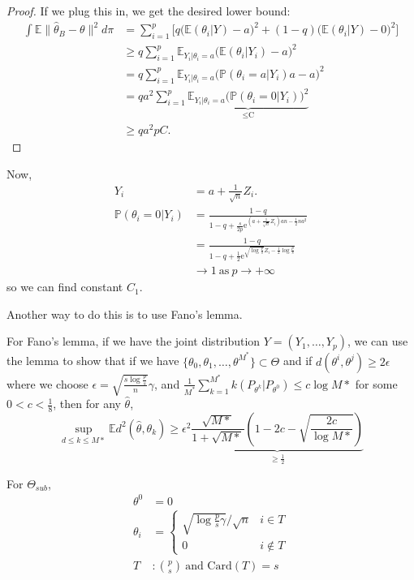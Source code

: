 \documentclass[twoside]{article}
\theoremstyle{definition}
\theoremstyle{definition}
\theoremstyle{remark}
\begin{document}
\begin{proof}
If we plug this in, we get the desired lower bound:
\[
\begin{aligned}
\int \mathbb{E} \| \hat\theta_B - \theta \|^2 d\pi &= \sum \limits_{i=1}^p \bigg[ q \bigg( \mathbb{E} (\theta_i | Y) - a \bigg)^2 + (1-q) \bigg( \mathbb{E} (\theta_i | Y) - 0 \bigg)^2 \bigg] \\
&\geq q \sum \limits_{i=1}^p \mathbb{E}_{Y_i | \theta_i = a} \bigg( \mathbb{E} (\theta_i | Y_i) - a \bigg) ^2 \\
&= q \sum \limits_{i=1}^p \mathbb{E}_{Y_i | \theta_i = a} \bigg( \mathbb{P} (\theta_i = a | Y_i)a - a \bigg)^2 \\
&= q a^2 \sum \limits_{i=1}^p \underbrace{\mathbb{E}_{Y_i | \theta_i = a} \bigg( \mathbb{P}(\theta_i = 0 | Y_i) \bigg)^2}_{\leq \text{C}} \\
&\geq qa^2pC.
\end{aligned}
\]

\end{proof}

Now,
\[
\begin{aligned}
Y_i &= a + \frac{1}{\sqrt{n}} Z_i. \\
\mathbb{P} (\theta_i = 0 | Y_i) &= \frac{1-q}{1-q + \frac{s}{2p} \mathrm{e}^{(a + \frac{1}{\sqrt{n}} Z_i)an - \frac{1}{2}na^2}} \\
&= \frac{1-q}{1-q + \frac{1}{2} \mathrm{e}^{\sqrt{\log \frac{p}{s}}Z_i - \frac{1}{2} \log \frac{p}{s}}} \\
&\to 1 \ \text{as} \ p \to +\infty
\end{aligned}
\]
so we can find constant $C_1$.

Another way to do this is to use Fano's lemma.

For Fano's lemma, if we have the joint distribution $Y= (Y_1, \ldots, Y_p)$, we can use the lemma to show that if we have $\{ \theta_0, \theta_1, \ldots, \theta^{M^*} \} \subset \Theta$ and if $d(\theta^i, \theta^j) \geq 2\epsilon$ where we choose $\epsilon = \sqrt{\frac{s \log \frac{p}{s}}{n}}\gamma$, and $\frac{1}{M^*} \sum \limits_{k=1}^{M^*}k(P_{\theta^k} | P_{\theta^0}) \leq c \log M*$ for some $0<c<\frac{1}{8}$, then for any $\hat\theta$,
\[
\sup \limits_{d \leq k \leq M*} \mathbb{E} d^2 (\hat\theta, \theta_k) \geq \epsilon^2 \underbrace{\frac{\sqrt{M*}}{1+\sqrt{M*}} (1 - 2c - \sqrt{\frac{2c}{\log M*}})}_{\geq \frac{1}{2}}
\]

For $\Theta_{sub}$,
\[
\begin{aligned}
\theta^0 &= 0 \\
\theta_i &= \begin{cases}
\sqrt{\log \frac{p}{s} \gamma} / \sqrt{n} & i \in T \\
0 & i \not \in T
\end{cases} \\
T &: {p \choose s} \ \text{and Card}(T)=s
\end{aligned}
\]
\end{document}
